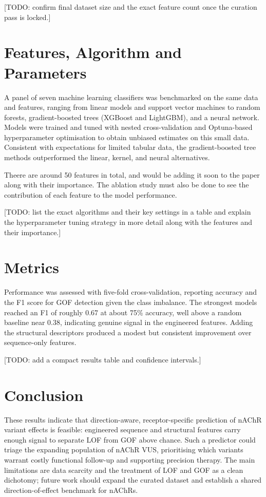 \documentclass{ws-procs11x85}
\begin{document}
[TODO: confirm final dataset size and the exact feature count once the curation pass is
locked.]

\section{Features, Algorithm and Parameters}\label{sec:algorithms}
A panel of seven machine learning classifiers was benchmarked on the same
data and features, ranging from linear models and support vector machines
to random forests, gradient-boosted trees (XGBoost and LightGBM), and a
neural network. Models were trained and tuned with nested cross-validation
and Optuna-based hyperparameter optimisation to obtain unbiased estimates
on this small data. Consistent with expectations for limited
tabular data, the gradient-boosted tree methods outperformed the linear,
kernel, and neural alternatives. 

Theere are around 50 features in total, and would be adding it soon to the paper along with their importance.
The ablation study must also be done to see the contribution of each feature to the model performance.

[TODO: list the exact algorithms
and their key settings in a table and explain the hyperparameter tuning strategy in more detail along with the features and their importance.]

\section{Metrics}\label{sec:metrics}
Performance was assessed with five-fold cross-validation, reporting
accuracy and the F1 score for GOF detection given the class imbalance.
The strongest models reached an F1 of roughly 0.67 at about 75\% accuracy,
well above a random baseline near 0.38, indicating genuine signal in the
engineered features. Adding the structural descriptors produced a modest
but consistent improvement over sequence-only features. 

[TODO: add a
compact results table and confidence intervals.]

\section{Conclusion}\label{sec:conclusion}
These results indicate that direction-aware, receptor-specific prediction
of nAChR variant effects is feasible: engineered sequence and structural
features carry enough signal to separate LOF from GOF above chance. Such a
predictor could triage the expanding population of nAChR VUS, prioritising
which variants warrant costly functional follow-up and supporting
precision therapy. The main limitations are data scarcity and the
treatment of LOF and GOF as a clean dichotomy; future work should expand
the curated dataset and establish a shared direction-of-effect benchmark
for nAChRs.
\end{document}
